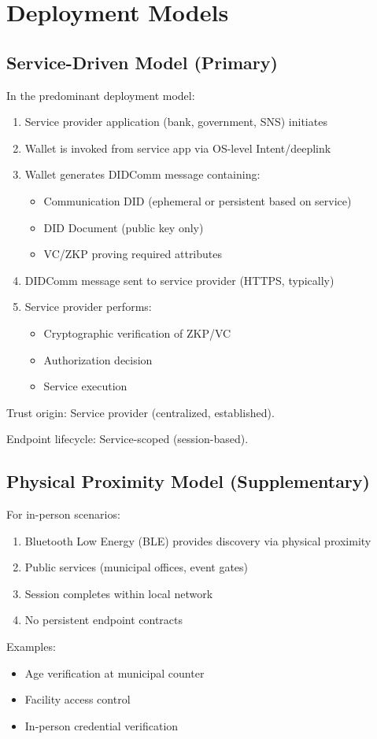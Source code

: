 \chapter{Deployment Models}

\section{Service-Driven Model (Primary)}

In the predominant deployment model:
\begin{enumerate}
  \item Service provider application (bank, government, SNS) initiates
  \item Wallet is invoked from service app via OS-level Intent/deeplink
  \item Wallet generates DIDComm message containing:
    \begin{itemize}
      \item Communication DID (ephemeral or persistent based on service)
      \item DID Document (public key only)
      \item VC/ZKP proving required attributes
    \end{itemize}
  \item DIDComm message sent to service provider (HTTPS, typically)
  \item Service provider performs:
    \begin{itemize}
      \item Cryptographic verification of ZKP/VC
      \item Authorization decision
      \item Service execution
    \end{itemize}
\end{enumerate}

Trust origin: Service provider (centralized, established).

Endpoint lifecycle: Service-scoped (session-based).

\section{Physical Proximity Model (Supplementary)}

For in-person scenarios:
\begin{enumerate}
  \item Bluetooth Low Energy (BLE) provides discovery via physical proximity
  \item Public services (municipal offices, event gates)
  \item Session completes within local network
  \item No persistent endpoint contracts
\end{enumerate}

Examples:
\begin{itemize}
  \item Age verification at municipal counter
  \item Facility access control
  \item In-person credential verification
\end{itemize}

